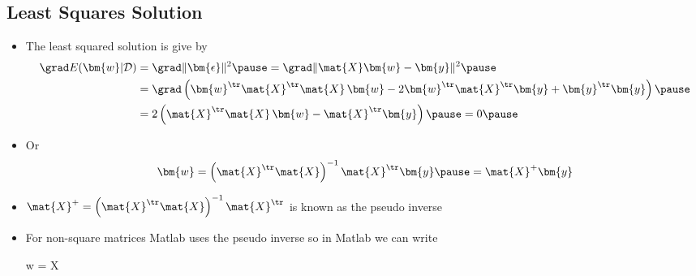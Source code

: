 
\begin{slide}
\section[-2]{Least Squares Solution}

\begin{PauseHighLight}

\begin{itemize}\squeeze
\item The least squared solution is give by
  \begin{align*}
    \grad E(\bm{w}|\mathcal{D}) &= \grad \|\bm{\epsilon}\|^2 \pause
    = \grad \| \mat{X} \bm{w} - \bm{y}\|^2 \pause \\
    &= \grad \left(\bm{w}^\tr
      \mat{X}^\tr\mat{X} \, \bm{w} -  2 \bm{w}^\tr\mat{X}^\tr \bm{y} +
      \bm{y}^\tr  \bm{y}\right)\pause\\
    &= 2 \left( \mat{X}^\tr\mat{X}\, \bm{w} - \mat{X}^\tr
      \bm{y}\right)\pause = 0 \pause
  \end{align*}
\item Or
  \begin{displaymath}
    \bm{w} = \left(\mat{X}^\tr\mat{X}\right)^{-1} \mat{X}^\tr \bm{y}\pause
    = \mat{X}^{+} \bm{y}
  \end{displaymath}
\item $\mat{X}^{+} = \left(\mat{X}^\tr\mat{X}\right)^{-1} \mat{X}^\tr$ is
  known as the pseudo inverse\pause
\item For non-square matrices Matlab uses the pseudo inverse so in
  Matlab we can write
  \begin{matlab}
    w = X\y
  \end{matlab}\pause
\end{itemize}

\end{PauseHighLight}
\end{slide}


\Outline %

